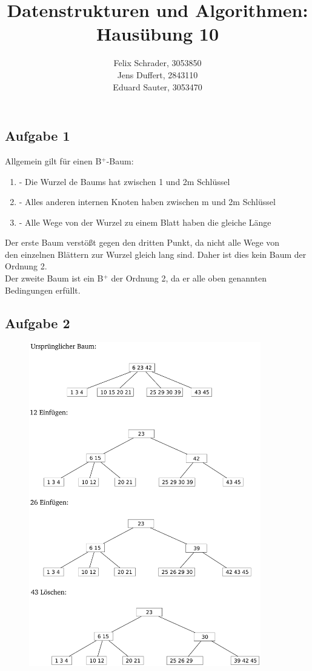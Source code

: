 \documentclass[11pt]{article}
\author{
  Felix Schrader, 3053850 \\ 
  Jens Duffert, 2843110 \\
  Eduard Sauter, 3053470
}
\title{Datenstrukturen und Algorithmen: Haus\"ubung 10}
\begin{document}
\maketitle
\subsection*{Aufgabe 1}
Allgemein gilt für einen B$^{+}$-Baum:\\
\begin{enumerate}
\item
	- Die Wurzel de Baums hat zwischen 1 und 2m Schlüssel
\item
	- Alles anderen internen Knoten haben zwischen m und 2m Schlüssel
\item
	- Alle Wege von der Wurzel zu einem Blatt haben die gleiche Länge
\end{enumerate}
	
Der erste Baum verstößt gegen den dritten Punkt, da nicht alle Wege von\\
den einzelnen Blättern zur Wurzel gleich lang sind. Daher ist dies kein Baum
der Ordnung 2.\\
Der zweite Baum ist ein B$^{+}$ der Ordnung 2, da er alle oben genannten 
Bedingungen erfüllt.
\newpage
\subsection*{Aufgabe 2}
\begin{figure}[h!]
  \centering
  \includegraphics[width=0.9\textwidth]{b+tree_insert_delete}
  \label{fig:tree_insert_delete}
\end{figure}
\newpage
\end{document}

